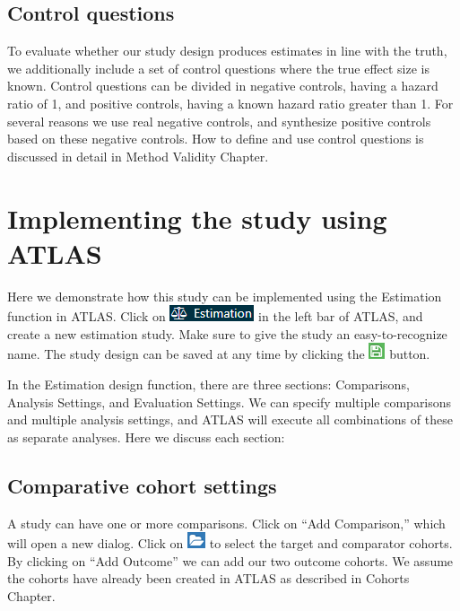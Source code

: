 \documentclass[]{book}
\begin{document}
\hypertarget{control-questions}{%
\subsection{Control questions}\label{control-questions}}

To evaluate whether our study design produces estimates in line with the truth, we additionally include a set of control questions where the true effect size is known. Control questions can be divided in negative controls, having a hazard ratio of 1, and positive controls, having a known hazard ratio greater than 1. For several reasons we use real negative controls, and synthesize positive controls based on these negative controls. How to define and use control questions is discussed in detail in Method Validity Chapter.

\hypertarget{PleAtlas}{%
\section{Implementing the study using ATLAS}\label{PleAtlas}}

Here we demonstrate how this study can be implemented using the Estimation function in ATLAS. Click on \includegraphics{images/PopulationLevelEstimation/estimation.png} in the left bar of ATLAS, and create a new estimation study. Make sure to give the study an easy-to-recognize name. The study design can be saved at any time by clicking the \includegraphics{images/PopulationLevelEstimation/save.png} button.

In the Estimation design function, there are three sections: Comparisons, Analysis Settings, and Evaluation Settings. We can specify multiple comparisons and multiple analysis settings, and ATLAS will execute all combinations of these as separate analyses. Here we discuss each section:

\hypertarget{ComparisonSettings}{%
\subsection{Comparative cohort settings}\label{ComparisonSettings}}

A study can have one or more comparisons. Click on ``Add Comparison,'' which will open a new dialog. Click on \includegraphics{images/PopulationLevelEstimation/open.png} to select the target and comparator cohorts. By clicking on ``Add Outcome'' we can add our two outcome cohorts. We assume the cohorts have already been created in ATLAS as described in Cohorts Chapter.
\end{document}
